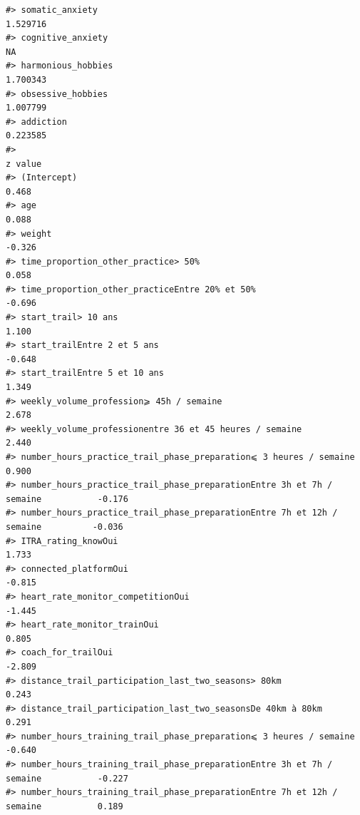 \documentclass[
]{article}
\begin{document}
\begin{verbatim}
#> somatic_anxiety                                                                  1.529716
#> cognitive_anxiety                                                                      NA
#> harmonious_hobbies                                                               1.700343
#> obsessive_hobbies                                                                1.007799
#> addiction                                                                        0.223585
#>                                                                                z value
#> (Intercept)                                                                      0.468
#> age                                                                              0.088
#> weight                                                                          -0.326
#> time_proportion_other_practice> 50%                                              0.058
#> time_proportion_other_practiceEntre 20% et 50%                                  -0.696
#> start_trail> 10 ans                                                              1.100
#> start_trailEntre 2 et 5 ans                                                     -0.648
#> start_trailEntre 5 et 10 ans                                                     1.349
#> weekly_volume_profession⩾ 45h / semaine                                          2.678
#> weekly_volume_professionentre 36 et 45 heures / semaine                          2.440
#> number_hours_practice_trail_phase_preparation⩽ 3 heures / semaine                0.900
#> number_hours_practice_trail_phase_preparationEntre 3h et 7h / semaine           -0.176
#> number_hours_practice_trail_phase_preparationEntre 7h et 12h / semaine          -0.036
#> ITRA_rating_knowOui                                                              1.733
#> connected_platformOui                                                           -0.815
#> heart_rate_monitor_competitionOui                                               -1.445
#> heart_rate_monitor_trainOui                                                      0.805
#> coach_for_trailOui                                                              -2.809
#> distance_trail_participation_last_two_seasons> 80km                              0.243
#> distance_trail_participation_last_two_seasonsDe 40km à 80km                      0.291
#> number_hours_training_trail_phase_preparation⩽ 3 heures / semaine               -0.640
#> number_hours_training_trail_phase_preparationEntre 3h et 7h / semaine           -0.227
#> number_hours_training_trail_phase_preparationEntre 7h et 12h / semaine           0.189

\end{verbatim}
\end{document}
